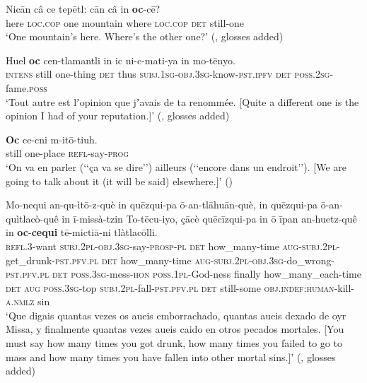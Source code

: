 \begin{exe}
	\ex \label{exAppendixClassicalNahuatlOther1}
	\gll Nicān câ ce tepētl: cān câ in \textbf{oc}-cē?\\
	here \textsc{loc}.\textsc{cop} one mountain where \textsc{loc}.\textsc{cop} \textsc{det} still-one\\
	\glt \lq One mountain's here. Where's the other one?\rq{ }(\cite[66]{LauneyMackay2011}, glosses added)

	\ex \label{exAppendixClassicalNahuatlOther2}
	\gll Huel \textbf{oc} cen-tlamantli in ic ni-c-mati-ya in mo-tēnyo.\\
	\textsc{intens} still one-thing \textsc{det} thus \textsc{subj}.1\textsc{sg}-\textsc{obj}.3\textsc{sg}-know-\textsc{pst}.\textsc{ipfv} \textsc{det} \textsc{poss}.2\textsc{sg}-fame.\textsc{poss}\\
	\glt \lq Tout autre est lʼopinion que jʼavais de ta renommée. [Quite a different one is the opinion I had of your reputation.]\rq{ }(\cite[1266]{Launey1986}, glosses added)

	\ex \label{exAppendixClassicalNahuatlOther3}
	\gll \textbf{Oc} ce-cni m-itō-tiuh.\\
	still one-place \textsc{refl}-say-\textsc{prog}\\
	\glt \lq On va en parler (\lq\lq{}ça va se dire\rq\rq{}) ailleurs (\lq\lq encore dans un endroit\rq\rq{}).	[We are going to talk about it (it will be said) elsewhere.]\rq{ }(\cite[1267]{Launey1986})

	\ex \label{exAppendixClassicalNahuatlOther4}
	\gll Mo-nequi an-qu-ìtō-z-què in quēzqui-pa ō-an-tlāhuān-què, in quēzqui-pa ō-an-quìtlacò-quê in ī-missà-tzin To-tēcu-iyo, çācè quēcīzqui-pa in ō īpan an-huetz-quê in \textbf{oc}-\textbf{cequi} tē-mictiā-ni tlàtlacōlli.\\
	\textsc{refl}.3-want \textsc{subj}.2\textsc{pl}-\textsc{obj}.3\textsc{sg}-say-\textsc{prosp}-\textsc{pl} \textsc{det} how\_many-time \textsc{aug}-\textsc{subj}.2\textsc{pl}-get\_drunk-\textsc{pst}.\textsc{pfv}.\textsc{pl}  \textsc{det} how\_many-time \textsc{aug}-\textsc{subj}.2\textsc{pl}-\textsc{obj}.3\textsc{sg}-do\_wrong-\textsc{pst}.\textsc{pfv}.\textsc{pl} \textsc{det} \textsc{poss}.3\textsc{sg}-mess-\textsc{hon} \textsc{poss}.1\textsc{pl}-God-ness	 finally how\_many\_each-time \textsc{det} \textsc{aug} \textsc{poss}.3\textsc{sg}-top \textsc{subj}.2\textsc{pl}-fall-\textsc{pst}.\textsc{pfv}.\textsc{pl} \textsc{det} still-some \textsc{obj}.\textsc{indef}:\textsc{human}-kill-\textsc{a}.\textsc{nmlz} sin\\
	\glt \lq Que digais quantas vezes os aueis emborrachado, quantas aueis dexado de oyr Missa, y finalmente quantas vezes aueis caido en otros pecados mortales. [You must say how many times you got drunk, how many times you failed to go to mass and how many times you have fallen into other mortal sins.]\rq{ }(\cite[117]{Carochi1645}, glosses added)
\end{exe}

